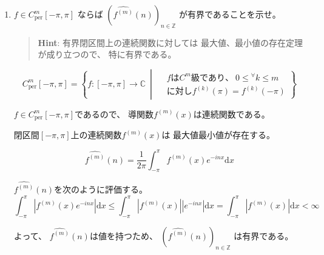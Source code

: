 \documentclass[12pt,b5paper]{ltjsarticle}
\begin{document}
\hrulefill

\begin{enumerate}
 \item
      $f\in C^{m}_{\mathrm{per}} [-\pi,\pi]$
      ならば
      $\left( \widehat{f^{(m)}}(n) \right)_{n\in\mathbb{Z}}$
      が有界であることを示せ。
      \begin{quotation}
       \textbf{Hint}:
       有界閉区間上の連続関数に対しては
       最大値、最小値の存在定理が成り立つので、
       特に有界である。
      \end{quotation}

      \dotfill

      \begin{equation}
       C^{m}_{\mathrm{per}}[-\pi,\pi]
        =\left\{
          f:[-\pi,\pi]\to\mathbb{C} \ \middle|\
          \begin{split}
           & fはC^{m}級であり、\
          0\leq {}^{\forall}k \leq m \\
          & に対し
          f^{(k)}(\pi)=f^{(k)}(-\pi)
          \end{split}
         \right\}
      \end{equation}



      $f\in C^{m}_{\mathrm{per}}[-\pi,\pi]$であるので、
      導関数$f^{(m)}(x)$は連続関数である。

      閉区間$[-\pi,\pi]$上の連続関数$f^{(m)}(x)$は
      最大値最小値が存在する。

      \begin{equation}
       \widehat{f^{(m)}}(n)
        = \frac{1}{2\pi} \int_{-\pi}^{\pi} f^{(m)}(x)e^{-inx} \mathrm{d}x
      \end{equation}


      $\widehat{f^{(m)}}(n)$を次のように評価する。
      \begin{equation}
       \int_{-\pi}^{\pi} \left| f^{(m)}(x)e^{-inx} \right| \mathrm{d}x
        \leq
        \int_{-\pi}^{\pi} \left| f^{(m)}(x) \right| \left| e^{-inx} \right| \mathrm{d}x
        =
        \int_{-\pi}^{\pi} \left| f^{(m)}(x) \right| \mathrm{d}x
        < \infty
      \end{equation}

      よって、
      $\widehat{f^{(m)}}(n)$は値を持つため、
      $\left( \widehat{f^{(m)}}(n) \right)_{n\in\mathbb{Z}}$
      は有界である。


\end{enumerate}
\end{document}
